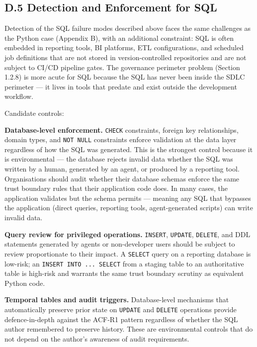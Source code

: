 \documentclass[a4paper,11pt]{report}
\begin{document}
\hypertarget{d.5-detection-and-enforcement-for-sql}{%
\subsection{D.5 Detection and Enforcement for
SQL}\label{d.5-detection-and-enforcement-for-sql}}

Detection of the SQL failure modes described above faces the same
challenges as the Python case (Appendix B), with an additional
constraint: SQL is often embedded in reporting tools, BI platforms, ETL
configurations, and scheduled job definitions that are not stored in
version-controlled repositories and are not subject to CI/CD pipeline
gates. The governance perimeter problem (Section 1.2.8) is more acute
for SQL because the SQL has never been inside the SDLC perimeter --- it
lives in tools that predate and exist outside the development workflow.

Candidate controls:

\textbf{Database-level enforcement.} \texttt{CHECK} constraints, foreign
key relationships, domain types, and \texttt{NOT\ NULL} constraints
enforce validation at the data layer regardless of how the SQL was
generated. This is the strongest control because it is environmental ---
the database rejects invalid data whether the SQL was written by a
human, generated by an agent, or produced by a reporting tool.
Organisations should audit whether their database schemas enforce the
same trust boundary rules that their application code does. In many
cases, the application validates but the schema permits --- meaning any
SQL that bypasses the application (direct queries, reporting tools,
agent-generated scripts) can write invalid data.

\textbf{Query review for privileged operations.} \texttt{INSERT},
\texttt{UPDATE}, \texttt{DELETE}, and DDL statements generated by agents
or non-developer users should be subject to review proportionate to
their impact. A \texttt{SELECT} query on a reporting database is
low-risk; an \texttt{INSERT\ INTO\ ...\ SELECT} from a staging table to
an authoritative table is high-risk and warrants the same trust boundary
scrutiny as equivalent Python code.

\textbf{Temporal tables and audit triggers.} Database-level mechanisms
that automatically preserve prior state on \texttt{UPDATE} and
\texttt{DELETE} operations provide defence-in-depth against the ACF-R1
pattern regardless of whether the SQL author remembered to preserve
history. These are environmental controls that do not depend on the
author's awareness of audit requirements.
\end{document}
